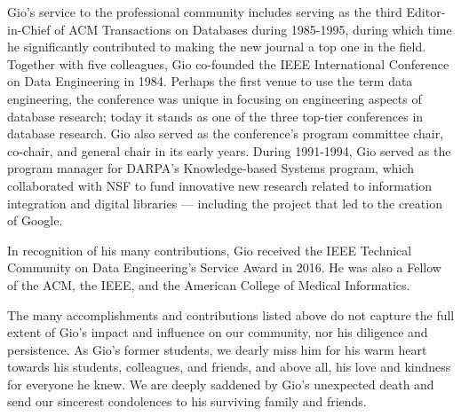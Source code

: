 \documentclass[11pt]{article}
\begin{document}
Gio’s service to the professional community includes serving as the third Editor-in-Chief of ACM Transactions on Databases during 1985-1995, during which time he significantly contributed to making the new journal a top one in the field. Together with five colleagues, Gio co-founded the IEEE International Conference on Data Engineering in 1984. Perhaps the first venue to use the term data engineering, the conference was unique in focusing on engineering aspects of database research; today it stands as one of the three top-tier conferences in database research. Gio also served as the conference’s program committee chair, co-chair, and general chair in its early years. During 1991-1994, Gio served as the program manager for DARPA’s Knowledge-based Systems program, which collaborated with NSF to fund innovative new research related to information integration and digital libraries — including the project that led to the creation of Google.


In recognition of his many contributions, Gio received the IEEE Technical Community on Data Engineering’s Service Award in 2016. He was also a Fellow of the ACM, the IEEE, and the American College of Medical Informatics.




The many accomplishments and contributions listed above do not capture the full extent of Gio’s impact and influence on our community, nor his diligence and persistence. As Gio’s former students, we dearly miss him for his warm heart towards his students, colleagues, and friends, and above all, his love and kindness for everyone he knew. We are deeply saddened by Gio’s unexpected death and send our sincerest condolences to his surviving family and friends.  




\end{document}
